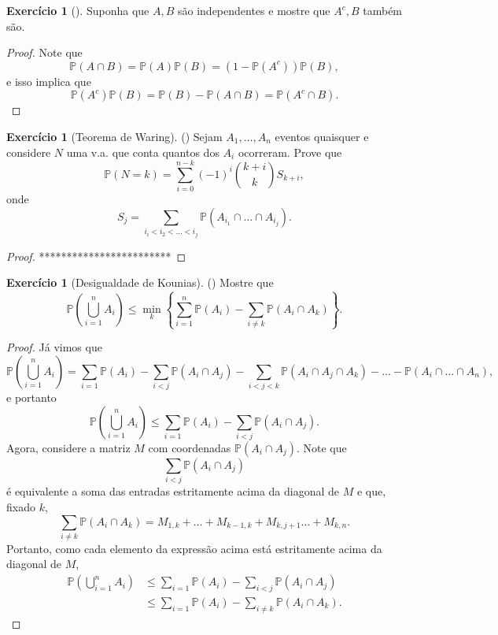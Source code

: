 \documentclass[12pt,a4paper,oneside]{book}
\theoremstyle{definition}
\newtheorem{xca}[theorem]{Exerc\'icio}
\theoremstyle{remark}
\numberwithin{equation}{section}
\newcommand{\pr}{\mathbb{P}}
\newcommand{\ds}{\displaystyle}
\begin{document}
\begin{xca}[\cite{grimmett2001one}]
Suponha que $A,B$ são independentes e mostre que $A^c, B$ também são.
\end{xca}
\begin{proof}
Note que
$$\pr(A\cap B) = \pr(A)\pr(B) = (1-\pr(A^c))\pr(B), $$
e isso implica que
$$ \pr(A^c)\pr(B) = \pr(B) - \pr(A\cap B) = \pr(A^c\cap B).$$
\end{proof}



\begin{xca}[Teorema de Waring](\cite{grimmett2001one}) Sejam $A_1,\dots,A_n$ eventos quaisquer e considere $N$ uma v.a. que conta quantos dos $A_i$ ocorreram. Prove que
$$\pr(N = k) = \sum_{i=0}^{n-k}(-1)^i{k+i\choose k}S_{k+i}, $$
onde 
$$S_j = \ds\sum_{i_i<i_2<\dots<i_j}\pr(A_{i_1}\cap\dots\cap A_{i_j} ). $$ 

\end{xca}




\begin{proof}
************************
\end{proof}





\begin{xca}[Desigualdade de Kounias](\cite{grimmett2001one}) Mostre que
$$\pr\left( \bigcup^n_{i=1}A_i \right)\leq \min_k\left\lbrace  \sum_{i=1}^n\pr(A_i) - \sum_{i\neq k} \pr(A_i\cap A_k)  \right\rbrace  .     $$
\end{xca}

\begin{proof}
Já vimos que 
$$\pr\left( \bigcup^n_{i=1} A_i\right)  = \sum_{i=1}\pr(A_i) -\sum_{i<j}\pr(A_i\cap A_j)  -\sum_{i<j<k}\pr(A_i\cap A_j\cap A_k)-\dots- \pr(A_i\cap\dots\cap A_n), $$
e portanto
$$\pr\left( \bigcup^n_{i=1} A_i\right)  \leq \sum_{i=1}\pr(A_i) -\sum_{i<j}\pr(A_i\cap A_j).$$
Agora, considere a matriz $M$ com coordenadas $\pr(A_i\cap A_j)$.  Note que
$$ \sum_{i<j}\pr(A_i\cap A_j) $$
é equivalente a soma das entradas estritamente acima da diagonal de $M$ e que, fixado $k$,
$$\sum_{i\neq k} \pr(A_i\cap A_k)=M_{1,k}+\dots+M_{k-1,k}+M_{k,j+1}\dots+M_{k,n}.$$
Portanto, como cada elemento da expressão acima está estritamente acima da diagonal de $M$,
\begin{align*}
\pr\left( \bigcup^n_{i=1} A_i\right) & \leq \sum_{i=1}\pr(A_i) -\sum_{i<j}\pr(A_i\cap A_j)\\
&\leq\sum_{i=1}\pr(A_i)- \sum_{i\neq k} \pr(A_i\cap A_k) .
\end{align*} 
\end{proof}
\end{document}
